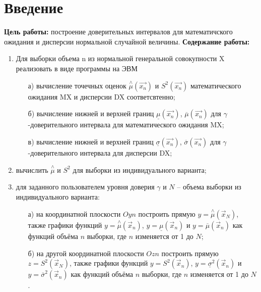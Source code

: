 \chapter*{Введение}
\textbf{Цель работы:} построение доверительных интервалов для математичского ожидания и дисперсии нормальной случайной величины.
\textbf{Содержание работы: }
\begin{enumerate}
	\item Для выборки объема n из нормальной генеральной совокупности X реализовать в виде программы на ЭВМ
	\begin{itemize}
		\item[а)] вычисление точечных оценок $\stackrel{\wedge}{\mu}(\overrightarrow{x_n})$ и $S^2(\overrightarrow{x_n})$ математического ожидания MX и дисперсии DX соответсвтенно;
		\item[б)] вычисление нижней и верхней границ $\underline{\mu}(\overrightarrow{x_n})$, $\overline{\mu}(\overrightarrow{x_n})$ для $\gamma$-доверительного интервала для математического ожидания MX;
		\item[в)] вычисление нижней и верхней границ $\underline{\sigma}(\overrightarrow{x_n})$, $\overline{\sigma}(\overrightarrow{x_n})$ для $\gamma$-доверительного интервала для  дисперсии DX;
	\end{itemize}
	\item вычислить $\stackrel{\wedge}{\mu}$ и $S^2$ для выборки из индивидуального варианта;
	\item для заданного пользователем уровня доверия $\gamma$ и $N$ – объема выборки из индивидуального варианта:
	\begin{itemize}
		\item[а)] на координатной плоскости $Oyn$ построить прямую
		$y = \stackrel{\wedge}{\mu}(\overrightarrow{x}_N)$, также графики функций
		$y = \stackrel{\wedge}{\mu}(\overrightarrow{x}_n)$,
		$y = \underline{\mu}(\overrightarrow{x}_n)$ и
		$y = \overline{\mu}(\overrightarrow{x}_n)$
		как функций объёма $n$ выборки, где $n$ изменяется от 1 до $N$;
		\item[б)] на другой координатной плоскости $Ozn$ построить прямую
		$z = S^2(\overrightarrow{x}_N)$, также графики функций
		$y = S^2(\overrightarrow{x}_n)$,
		$y = \underline{\sigma}^2(\overrightarrow{x}_n)$ и
		$y = \overline{\sigma}^2(\overrightarrow{x}_n)$
		как функций объёма $n$ выборки, где $n$ изменяется от 1 до $N$.
	\end{itemize}
\end{enumerate}